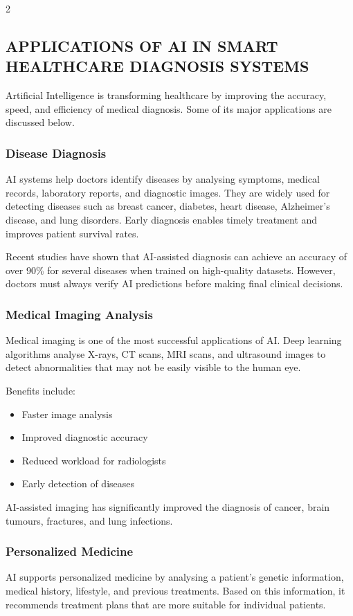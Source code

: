 \begin{multicols}{2}
  \subsection*{\centering\uppercase{Applications of AI in Smart Healthcare Diagnosis Systems}}
  Artificial Intelligence is transforming healthcare by improving the accuracy, speed, and efficiency of medical diagnosis. Some of its major applications are discussed below.

  \subsubsection*{Disease Diagnosis}
  AI systems help doctors identify diseases by analysing symptoms, medical records, laboratory reports, and diagnostic images. They are widely used for detecting diseases such as breast cancer, diabetes, heart disease, Alzheimer's disease, and lung disorders. Early diagnosis enables timely treatment and improves patient survival rates.

  \noindent
  Recent studies have shown that AI-assisted diagnosis can achieve an accuracy of over 90\% for several diseases when trained on high-quality datasets. However, doctors must always verify AI predictions before making final clinical decisions.

  \subsubsection*{Medical Imaging Analysis}
  Medical imaging is one of the most successful applications of AI. Deep learning algorithms analyse X-rays, CT scans, MRI scans, and ultrasound images to detect abnormalities that may not be easily visible to the human eye.

  \noindent
  Benefits include:
  \begin{itemize}
    \item Faster image analysis
    \item Improved diagnostic accuracy
    \item Reduced workload for radiologists
    \item Early detection of diseases
  \end{itemize}

  AI-assisted imaging has significantly improved the diagnosis of cancer, brain tumours, fractures, and lung infections.

  \subsubsection*{Personalized Medicine}
  {\justifying
  AI supports personalized medicine by analysing a patient's genetic information, medical history, lifestyle, and previous treatments. Based on this information, it recommends treatment plans that are more suitable for individual patients.
  \par}


\end{multicols}
